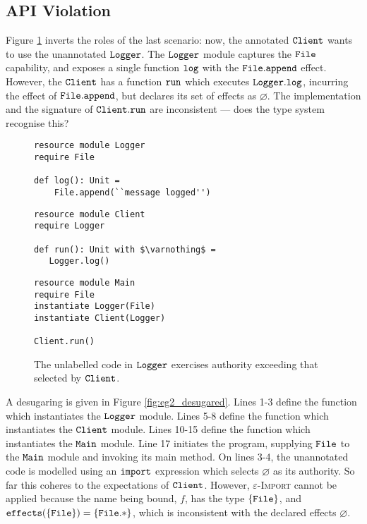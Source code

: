 \subsection{API Violation}

Figure \ref{fig:eg2} inverts the roles of the last scenario: now, the annotated $\mathtt{Client}$ wants to use the unannotated $\mathtt{Logger}$. The $\mathtt{Logger}$ module captures the $\mathtt{File}$ capability, and exposes a single function $\mathtt{log}$ with the $\mathtt{File.append}$ effect. However, the $\mathtt{Client}$ has a function $\mathtt{run}$ which executes $\mathtt{Logger.log}$, incurring the effect of $\mathtt{File.append}$, but declares its set of effects as $\varnothing$. The implementation and the signature of $\mathtt{Client.run}$ are inconsistent --- does the type system recognise this?

\begin{figure}[h]

\begin{lstlisting}
resource module Logger
require File

def log(): Unit =
    File.append(``message logged'')
\end{lstlisting}

\begin{lstlisting}
resource module Client
require Logger

def run(): Unit with $\varnothing$ =
   Logger.log()
\end{lstlisting}

\begin{lstlisting}
resource module Main
require File
instantiate Logger(File)
instantiate Client(Logger)

Client.run()
\end{lstlisting}

\caption{The unlabelled code in $\mathtt{Logger}$ exercises authority exceeding that selected by $\mathtt{Client}$.}
\label{fig:eg2}
\end{figure}

A desugaring is given in Figure \ref{fig:eg2_desugared}. Lines 1-3 define the function which instantiates the $\mathtt{Logger}$ module. Lines 5-8 define the function which instantiates the $\mathtt{Client}$ module. Lines 10-15 define the function which instantiates the $\mathtt{Main}$ module. Line 17 initiates the program, supplying $\mathtt{File}$ to the $\mathtt{Main}$ module and invoking its main method. On lines 3-4, the unannotated code is modelled using an $\mathtt{import}$ expression which selects $\varnothing$ as its authority. So far this coheres to the expectations of $\mathtt{Client}$. However, \textsc{$\varepsilon$-Import} cannot be applied because the name being bound, $f$, has the type $\{ \mathtt{File} \}$, and $\mathtt{effects}(\{ \mathtt{File} \}) = \{ \mathtt{File}.* \}$, which is inconsistent with the declared effects $\varnothing$.

